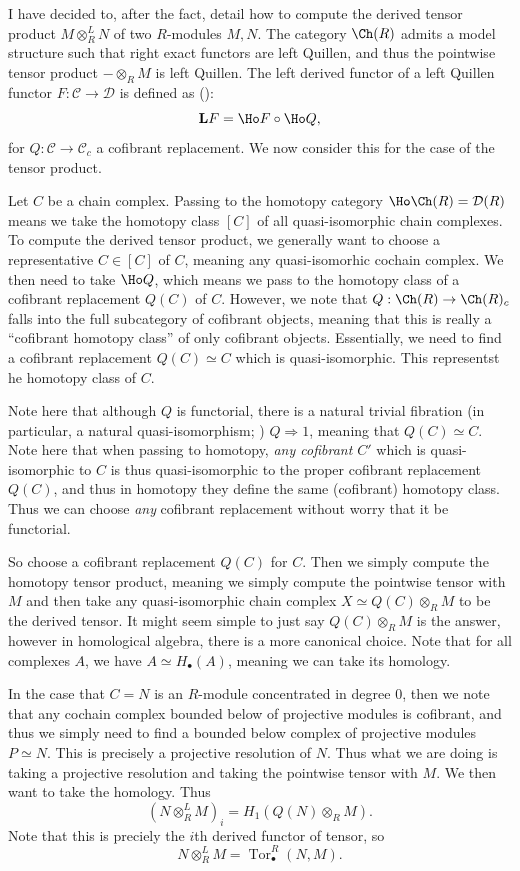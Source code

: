 \begin{construction}
	I have decided to, after the fact, detail how to compute the derived tensor product $M\otimes _R^LN$ of two $R$-modules $M,N$. The category $\Ch(R) $ admits a model structure such that right exact functors are left Quillen, and thus the pointwise tensor product $-\otimes _RM$ is left Quillen. The left derived functor of a left Quillen functor $F : \mathcal{C}  \to \mathcal{D} $ is defined as (\cite{hovey}):
	\[
		\mathbf{L} F = \Ho F \circ \Ho Q,
	\]
	for $Q : \mathcal{C}  \to \mathcal{C} _c$ a cofibrant replacement. We now consider this for the case of the tensor product.

	Let $C$ be a chain complex. Passing to the homotopy category $\Ho \Ch(R)=\mathcal{D} (R) $ means we take the homotopy class $[C]$ of all quasi-isomorphic chain complexes. To compute the derived tensor product, we generally want to choose a representative $C\in [C]$ of $C$, meaning any quasi-isomorhic cochain complex. We then need to take $\Ho Q$, which means we pass to the homotopy class of a cofibrant replacement $Q(C)$ of $C$. However, we note that $Q : \Ch(R)  \to \Ch(R)_c$ falls into the full subcategory of cofibrant objects, meaning that this is really a ``cofibrant homotopy class'' of only cofibrant objects. Essentially, we need to find a cofibrant replacement $Q(C) \simeq C$ which is quasi-isomorphic. This representst he homotopy class of $C$.

	Note here that although $Q$ is functorial, there is a natural trivial fibration (in particular, a natural quasi-isomorphism; \cite{hovey}) $Q \Rightarrow 1$, meaning that $Q(C) \simeq C$. Note here that when passing to homotopy, \emph{any cofibrant $C'$} which is quasi-isomorphic to $C$ is thus quasi-isomorphic to the proper cofibrant replacement $Q(C)$, and thus in homotopy they define the same (cofibrant) homotopy class. Thus we can choose \emph{any} cofibrant replacement without worry that it be functorial.

	So choose a cofibrant replacement $Q(C)$ for $C$. Then we simply compute the homotopy tensor product, meaning we simply compute the pointwise tensor with $M$ and then take any quasi-isomorphic chain complex $X \simeq Q(C) \otimes _RM$ to be the derived tensor. It might seem simple to just say $Q(C) \otimes _RM$ is the answer, however in homological algebra, there is a more canonical choice. Note that for all complexes $A$, we have $A \simeq H_{\bullet}(A)$, meaning we can take its homology.

	In the case that $C=N$ is an $R$-module concentrated in degree 0, then we note that any cochain complex bounded below of projective modules is cofibrant, and thus we simply need to find a bounded below complex of projective modules $P \simeq N$. This is precisely a projective resolution of $N$. Thus what we are doing is taking a projective resolution and taking the pointwise tensor with $M$. We then want to take the homology. Thus
	\[
		(N\otimes _R^LM)_i = H_1(Q(N) \otimes _RM)
	.\]
	Note that this is preciely the $i$th derived functor of tensor, so
	\[
		N\otimes _R^LM = \operatorname{Tor}^R_{\bullet}(N,M)
	.\]
	


\end{construction}
